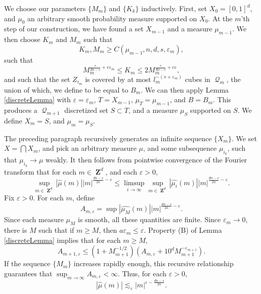\documentclass[12pt,reqno]{article}
\DeclareMathOperator{\ZZ}{\mathbf{Z}}
\DeclareMathOperator{\DQ}{\mathcal{Q}}
\begin{document}
We choose our parameters $\{ M_m \}$ and $\{ K_k \}$ inductively. First, set $X_0 = [0,1]^d$, and $\mu_0$ an arbitrary smooth probability measure supported on $X_0$. At the $m$'th step of our construction, we have found a set $X_{m-1}$ and a measure $\mu_{m-1}$. We then choose $K_m$ and $M_m$ such that
%
\[ K_m, M_m \geq C(\mu_{m-1}, n, d, s, \varepsilon_m), \]
%
such that
%
\[ M_m^{\frac{s}{dn-s} + c\varepsilon_m} \leq K_m \leq 2 M_m^{\frac{s}{dn-s} + c\varepsilon}, \]
%
and such that the set $Z_{i_m}$ is covered by at most $l_m^{-(s + \varepsilon_m)}$ cubes in $\DQ_m$, the union of which, we define to be equal to $B_m$. We can then apply Lemma \ref{discreteLemma} with $\varepsilon = \varepsilon_m$, $T = X_{m-1}$, $\mu_T = \mu_{m-1}$, and $B = B_m$. This produces a $\DQ_{m+1}$ discretized set $S \subset T$, and a measure $\mu_S$ supported on $S$. We define $X_m = S$, and $\mu_m = \mu_S$.

The preceding paragraph recursively generates an infinite sequence $\{ X_m \}$. We set $X = \bigcap X_m$, and pick an arbitrary measure $\mu$, and some subsequence $\mu_{i_k}$, such that $\mu_{i_k} \to \mu$ weakly. It then follows from pointwise convergence of the Fourier transform that for each $m \in \ZZ^d$, and each $\varepsilon > 0$,
%
\[ \sup_{m \in \ZZ^d} |\widehat{\mu}(m)| |m|^{\frac{dn-s}{2n} - \varepsilon} \leq \limsup_{i \to \infty} \sup_{m \in \ZZ^d} |\widehat{\mu_i}(m)| |m|^{\frac{dn - s}{2n} - \varepsilon}. \]
%
Fix $\varepsilon > 0$. For each $m$, define
%
\[ A_{m,\varepsilon} = \sup |\widehat{\mu_M}(m)| |m|^{\frac{dn-s}{2n} - \varepsilon}. \]
%
Since each measure $\mu_M$ is smooth, all these quantities are finite. Since $\varepsilon_m \to 0$, there is $M$ such that if $m \geq M$, then $a \varepsilon_m \leq \varepsilon$. Property (B) of Lemma \eqref{discreteLemma} implies that for each $m \geq M$,
%
\[ A_{m+1,\varepsilon} \leq (1 + M_{m+1}^{-1/2})(A_{m,\varepsilon} + 10^d M_{m+1}^{-\varepsilon_{m+1}}). \]
%
If the sequence $\{ M_m \}$ increases rapidly enough, this recursive relationship guarantees that $\sup_{m \to \infty} A_{m,\varepsilon} < \infty$. Thus, for each $\varepsilon > 0$,
%
\[ |\widehat{\mu}(m)| \lesssim_\varepsilon |m|^{\varepsilon - \frac{dn-s}{2n}}.  \]
\end{document}
